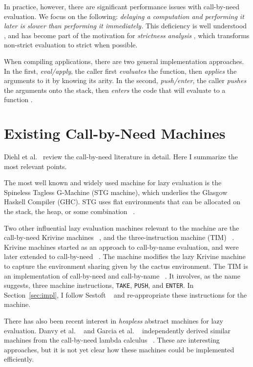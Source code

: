 In practice, however, there are significant performance issues with call-by-need
evaluation.  We focus on the following: \emph{delaying a computation and
performing it later is slower than performing it immediately.} This deficiency
is well understood \cite{johnsson1984efficient,jonesstg}, and has become part of
the motivation for \emph{strictness analysis}
\cite{mycroft1982abstract,wadler1987projections}, which transforms non-strict
evaluation to strict when possible.

When compiling applications, there are two general implementation approaches.
In the first, \emph{eval/apply}, the caller first \emph{evaluates} the function,
then \emph{applies} the arguments to it by knowing its arity. In the second,
\emph{push/enter}, the caller \emph{pushes} the arguments onto the stack, then
\emph{enters} the code that will evaluate to a function \cite{marlow2006making}.  

\section{Existing Call-by-Need Machines}

Diehl et al.~\cite{diehl2000abstract} review the call-by-need
literature in detail.  Here I summarize the most relevant points.

The most well known and widely used machine for lazy evaluation is the
Spineless Tagless G-Machine (STG machine), which underlies the Glasgow Haskell
Compiler (GHC).  STG uses flat environments that can be allocated on the stack,
the heap, or some combination ~\cite{jonesstg}.  

Two other influential lazy evaluation machines relevant to the \ce 
machine are the call-by-need Krivine machines
~\cite{lkm,krivine2007call,sestoft}, and the three-instruction machine (TIM)
~\cite{TIM}.  Krivine machines started as an approach to call-by-name
evaluation, and were later extended to call-by-need
~\cite{krivine2007call,sestoft,danvy2013synthetic,lkm}.  The \ce machine
modifies the lazy Krivine machine to capture the environment sharing given by
the cactus environment. The TIM is an implementation of call-by-need and
call-by-name ~\cite{TIM}.  It involves, as the name suggests, three machine
instructions, \texttt{TAKE}, \texttt{PUSH}, and \texttt{ENTER}. In
Section~\ref{sec:impl}, I follow Sestoft ~\cite{sestoft} and
re-appropriate these instructions for the \ce machine.

There has also been recent interest in \emph{heapless} abstract
machines for lazy evaluation. Danvy et al. ~\cite{danvy2012inter} and
Garcia et al. ~\cite{garcia2009lazy} independently derived similar
machines from the call-by-need lambda calculus
~\cite{ariola1995call}. These are interesting approaches, but it is not yet
clear how these machines could be implemented efficiently.

